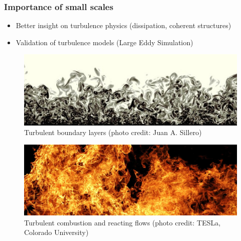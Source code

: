 \documentclass{beamer}
\let\olditem\item
\renewcommand{\item}{\setlength{\itemsep}{\fill}\olditem}
\begin{document}
\begin{frame}
\frametitle{Importance of small scales}
	\begin{itemize}
		\item Better insight on turbulence physics (dissipation, coherent structures)
		\item Validation of turbulence models (Large Eddy Simulation)
	\end{itemize}
	\pause
	\begin{overprint}
	\begin{figure}
		\includegraphics[width=.9\textwidth]{./figures/turbulence/nearwallturb.jpg}
		\caption*{Turbulent boundary layers (photo credit: Juan A. Sillero)}
	\end{figure}
	\begin{figure}
		\includegraphics[width=.9\textwidth]{./figures/turbulence/flame.jpg}
		\caption*{Turbulent combustion and reacting flows (photo credit: TESLa, Colorado University)}
	\end{figure}
	\end{overprint}
\end{frame}
\end{document}
